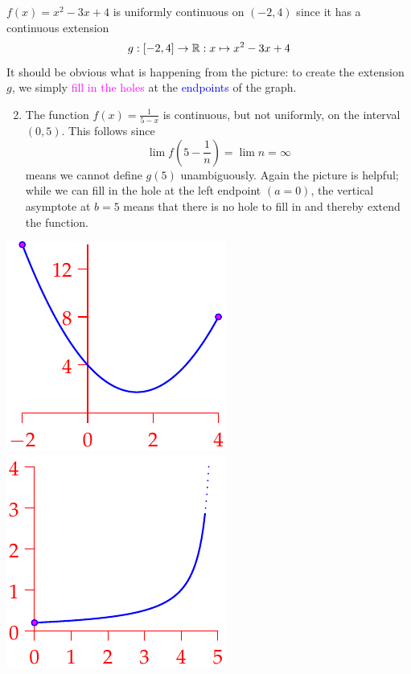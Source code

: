 \begin{examples}[lower separated=false, sidebyside, sidebyside align=top seam, sidebyside gap=0pt, righthand width=0.3\linewidth]{}{}
	\exstart $f(x)=x^2-3x+4$ is uniformly continuous on $(-2,4)$ since it has a continuous extension
	\[
		g:[-2,4]\to\mathbb{R}:x\mapsto x^2-3x+4
	\]
	It should be obvious what is happening from the picture: to create the extension $g$, we simply \textcolor{Magenta}{fill in the holes} at the \textcolor{blue}{endpoints} of the graph.   
	\bigskip\smallskip
	\begin{enumerate}\setcounter{enumi}{1}
	  \item The function $f(x)=\frac 1{5-x}$ is continuous, but not uniformly, on the interval $(0,5)$. This follows since
		\[
			\lim f\left(5-\frac 1n\right)=\lim n=\infty
		\]
		means we cannot define $g(5)$ unambiguously. Again the picture is helpful; while we can fill in the hole at the left endpoint $(a=0)$, the vertical asymptote at $b=5$ means that there is no hole to fill in and thereby extend the function.
	\end{enumerate}
	\tcblower
	\flushright\includegraphics[scale=0.95]{unifcont3}\\
	\includegraphics[scale=0.95]{unifcont4}
\end{examples}

